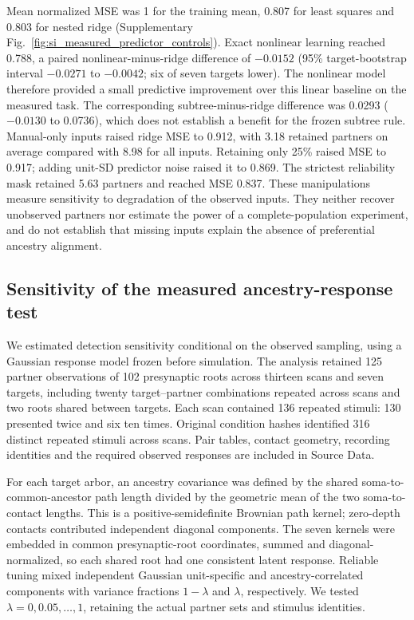 Mean normalized MSE was 1 for the training mean, 0.807 for least squares and
0.803 for nested ridge (Supplementary Fig.~\ref{fig:si_measured_predictor_controls}).
Exact nonlinear learning reached 0.788, a paired nonlinear-minus-ridge
difference of $-0.0152$ (95\% target-bootstrap interval $-0.0271$ to
$-0.0042$; six of seven targets lower). The nonlinear model therefore provided a small predictive improvement over
this linear baseline on the measured task. The corresponding
subtree-minus-ridge difference was 0.0293 ($-0.0130$ to 0.0736), which
does not establish a benefit for the frozen subtree rule. Manual-only inputs
raised ridge MSE to 0.912, with 3.18 retained partners on average compared
with 8.98 for all inputs. Retaining only 25\% raised MSE to 0.917; adding
unit-SD predictor noise raised it to 0.869. The strictest reliability mask
retained 5.63 partners and reached MSE 0.837. These manipulations measure
sensitivity to degradation of the observed inputs. They neither recover
unobserved partners nor estimate the power of a complete-population experiment,
and do not establish that missing inputs explain the absence of preferential
ancestry alignment.

\subsection{Sensitivity of the measured ancestry-response test}
\label{note:measured_alignment_power}
We estimated detection sensitivity conditional on the observed sampling, using a Gaussian response model frozen before simulation. The analysis retained 125 partner observations of 102 presynaptic roots across thirteen scans and seven targets, including twenty target--partner combinations repeated across scans and two roots shared between targets. Each scan contained 136 repeated stimuli: 130 presented twice and six ten times. Original condition hashes identified 316 distinct repeated stimuli across scans. Pair tables, contact geometry, recording identities and the required observed responses are included in Source Data.

For each target arbor, an ancestry covariance was defined by the shared soma-to-common-ancestor path length divided by the geometric mean of the two soma-to-contact lengths. This is a positive-semidefinite Brownian path kernel; zero-depth contacts contributed independent diagonal components. The seven kernels were embedded in common presynaptic-root coordinates, summed and diagonal-normalized, so each shared root had one consistent latent response. Reliable tuning mixed independent Gaussian unit-specific and ancestry-correlated components with variance fractions $1-\lambda$ and $\lambda$, respectively. We tested $\lambda=0,0.05,\ldots,1$, retaining the actual partner sets and stimulus identities.

